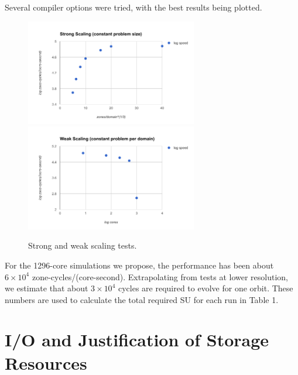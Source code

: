 \documentclass[preprint]{aastex}
\begin{document}
Several compiler options were tried, with the best results being plotted.  
  
\begin{figure}[h]
\label{figScaling}
\vspace{-0.3cm}
\begin{center}
\includegraphics[width=75mm]{./strongScaling.png}
\includegraphics[width=75mm]{./weakScaling.png}
\vspace{-0.3cm}
\caption{Strong and weak scaling tests.}
\end{center}
\vspace{-0.6cm}
\label{fig:weakScaling}
\end{figure}

For the 1296-core simulations we propose, the performance has been about $6 \times 10^4$ zone-cycles/(core-second).  Extrapolating from tests at lower resolution, we estimate that about $3 \times 10^4$ cycles are required to evolve for one orbit. These numbers are used to calculate the total required SU for each run in Table 1.  


\vspace{-8mm}
\section{I/O and Justification of Storage Resources}
\vspace{-2mm}
\end{document}
